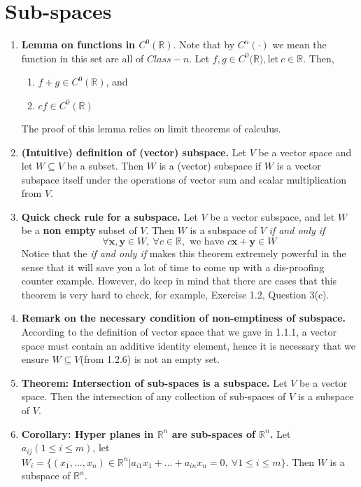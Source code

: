 \documentclass[oneside, 12pt]{book}
\newcommand{\settag}[1]{\renewcommand{\theenumi}{#1}}
\newcommand{\R}{\mathbb{R}}
\newcommand{\tit}[1]{\textit{#1}}
\begin{document}
\section{Sub-spaces}
    \begin{enumerate}
        \settag{1.2.4}
        \item \textbf{Lemma on functions in $C^0(\mathbb{R})$}. Note that by $C^n(\cdot)$ we mean the function in this set are all of $Class-n$. Let $f,g \in C^0(\mathbb{R)}, \text{let} ~c\in \mathbb{R}$. Then, 
        \begin{enumerate}
            \item $f+g\in C^0(\R)$, and
            \item $cf \in C^0(\R)$
        \end{enumerate}
        The proof of this lemma relies on limit theorems of calculus.\newline
        
        \settag{1.2.6}
        \item \textbf{(Intuitive) definition of (vector) subspace.} Let $V$ be a vector space and let $W\subseteq V$ be a subset. Then $W$ is a (vector) subspace if $W$ is a vector subspace itself under the operations of vector sum and scalar multiplication from $V$.
        
        \settag{1.2.8}
        \item \textbf{Quick check rule for a subspace.} Let $V$ be a vector subspace, and let $W$ be a \textbf{non empty} subset of $V$. Then $W$ is a subspace of $V$ \tit{if and only if} 
        \begin{equation*}
            \forall \mathbf{x}, \mathbf{y}\in W,~\forall c\in \R, \text{ we have } c\mathbf{x}+\mathbf{y}\in W
        \end{equation*}
        Notice that the \tit{if and only if} makes this theorem extremely powerful in the sense that it will save you a lot of time to come up with a dis-proofing counter example. However, do keep in mind that there are cases that this theorem is very hard to check, for example, Exercise 1.2, Question 3(c).
        
        \settag{1.2.9}
        \item \textbf{Remark on the necessary condition of non-emptiness of subspace.} According to the definition of vector space that we gave in 1.1.1, a vector space must contain an additive identity element, hence it is necessary that we ensure $W\subseteq V$(from 1.2.6) is not an empty set.
        
        \settag{1.2.13}
        \item \textbf{Theorem: Intersection of sub-spaces is a subspace.} Let $V$ be a vector space. Then the intersection of any collection of sub-spaces of $V$ is a subspace of $V$.
        
        \settag{1.2.14}
        \item \textbf{Corollary: Hyper planes in $\R^n$ are sub-spaces of $\R^n$.} Let $a_{ij}(1\leq i\leq m)$, let $W_i = \{(x_1, \ldots, x_n)\in \R^n|a_{i1}x_1 + \ldots + a_{in}x_n = 0,~\forall 1 \leq i \leq m\}$. Then $W$ is a subspace of $\R^n$.
        
    \end{enumerate}
    
\end{document}
